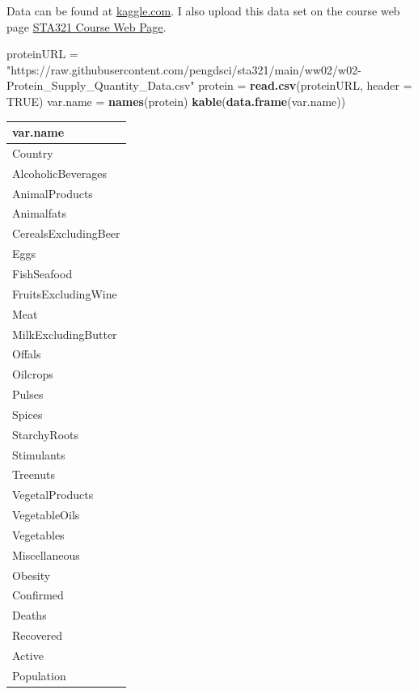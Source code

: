 \documentclass[
]{book}
\newenvironment{Shaded}{\begin{snugshade}}{\end{snugshade}}
\newcommand{\AttributeTok}[1]{\textcolor[rgb]{0.13,0.29,0.53}{#1}}
\newcommand{\ConstantTok}[1]{\textcolor[rgb]{0.56,0.35,0.01}{#1}}
\newcommand{\FunctionTok}[1]{\textcolor[rgb]{0.13,0.29,0.53}{\textbf{#1}}}
\newcommand{\NormalTok}[1]{#1}
\newcommand{\OtherTok}[1]{\textcolor[rgb]{0.56,0.35,0.01}{#1}}
\newcommand{\StringTok}[1]{\textcolor[rgb]{0.31,0.60,0.02}{#1}}
\begin{document}
Data can be found at \href{https://www.kaggle.com/mariaren/covid19-healthy-diet-dataset?select=Protein_Supply_Quantity_Data.csv}{kaggle.com}. I also upload this data set on the course web page \href{https://raw.githubusercontent.com/pengdsci/sta321/main/ww02/w02-Protein_Supply_Quantity_Data.csv}{STA321 Course Web Page}.

\begin{Shaded}
\begin{Highlighting}[]
\NormalTok{proteinURL }\OtherTok{=} \StringTok{"https://raw.githubusercontent.com/pengdsci/sta321/main/ww02/w02{-}Protein\_Supply\_Quantity\_Data.csv"}
\NormalTok{protein }\OtherTok{=} \FunctionTok{read.csv}\NormalTok{(proteinURL, }\AttributeTok{header =} \ConstantTok{TRUE}\NormalTok{)}
\NormalTok{var.name }\OtherTok{=} \FunctionTok{names}\NormalTok{(protein)}
\FunctionTok{kable}\NormalTok{(}\FunctionTok{data.frame}\NormalTok{(var.name))}
\end{Highlighting}
\end{Shaded}

\begin{tabular}{l}
\hline
var.name\\
\hline
Country\\
\hline
AlcoholicBeverages\\
\hline
AnimalProducts\\
\hline
Animalfats\\
\hline
CerealsExcludingBeer\\
\hline
Eggs\\
\hline
FishSeafood\\
\hline
FruitsExcludingWine\\
\hline
Meat\\
\hline
MilkExcludingButter\\
\hline
Offals\\
\hline
Oilcrops\\
\hline
Pulses\\
\hline
Spices\\
\hline
StarchyRoots\\
\hline
Stimulants\\
\hline
Treenuts\\
\hline
VegetalProducts\\
\hline
VegetableOils\\
\hline
Vegetables\\
\hline
Miscellaneous\\
\hline
Obesity\\
\hline
Confirmed\\
\hline
Deaths\\
\hline
Recovered\\
\hline
Active\\
\hline
Population\\
\hline
\end{tabular}
\end{document}
